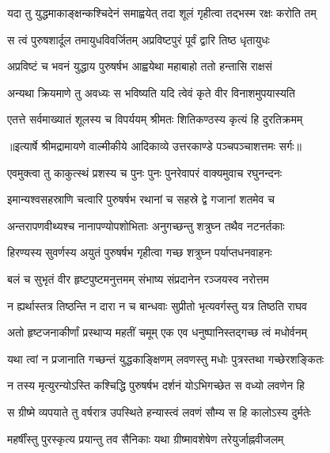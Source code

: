 \twolineshloka
{यदा तु युद्धमाकाङ्क्षन्कश्चिदेनं समाह्वयेत्}
{तदा शूलं गृहीत्वा तद्भस्म रक्षः करोति तम्} %

\twolineshloka
{स त्वं पुरुषशार्दूल तमायुधविवर्जितम्}
{अप्रविष्टपुरं पूर्वं द्वारि तिष्ठ धृतायुधः} %

\twolineshloka
{अप्रविष्टं च भवनं युद्धाय पुरुषर्षभ}
{आह्वयेथा महाबाहो ततो हन्तासि राक्षसं} %

\twolineshloka
{अन्यथा क्रियमाणे तु अवध्यः स भविष्यति}
{यदि त्वेवं कृते वीर विनाशमुपयास्यति} %

\twolineshloka
{एतत्ते सर्वमाख्यातं शूलस्य च विपर्ययम्}
{श्रीमतः शितिकण्ठस्य कृत्यं हि दुरतिक्रमम्} %


{॥इत्यार्षे श्रीमद्रामायणे वाल्मीकीये आदिकाव्ये उत्तरकाण्डे पञ्चपञ्चाशत्तमः सर्गः॥}


\twolineshloka
{एवमुक्त्वा तु काकुत्स्थं प्रशस्य च पुनः पुनः}
{पुनरेवापरं वाक्यमुवाच रघुनन्दनः} %

\twolineshloka
{इमान्यश्वसहस्राणि चत्वारि पुरुषर्षभ}
{रथानां च सहस्रे द्वे गजानां शतमेव च} %

\twolineshloka
{अन्तरापणवीथ्यश्च नानापण्योपशोभिताः}
{अनुगच्छन्तु शत्रुघ्न तथैव नटनर्तकाः} %

\twolineshloka
{हिरण्यस्य सुवर्णस्य अयुतं पुरुषर्षभ}
{गृहीत्वा गच्छ शत्रुघ्न पर्याप्तधनवाहनः} %

\twolineshloka
{बलं च सुभृतं वीर हृष्टपुष्टमनुत्तमम्}
{संभाष्य संप्रदानेन रञ्जयस्व नरोत्तम} %

\twolineshloka
{न ह्यर्थास्तत्र तिष्ठन्ति न दारा न च बान्धवाः}
{सुप्रीतो भृत्यवर्गस्तु यत्र तिष्ठति राघव} %

\twolineshloka
{अतो हृष्टजनाकीर्णां प्रस्थाप्य महतीं चमूम्}
{एक एव धनुष्पानिस्तद्गच्छ त्वं मधोर्वनम्} %

\twolineshloka
{यथा त्वां न प्रजानाति गच्छन्तं युद्धकाङ्क्षिणम्}
{लवणस्तु मधोः पुत्रस्तथा गच्छेरशङ्कितः} %

\twolineshloka
{न तस्य मृत्युरन्योऽस्ति कश्चिद्धि पुरुषर्षभ}
{दर्शनं योऽभिगच्छेत स वध्यो लवणेन हि} %

\twolineshloka
{स ग्रीष्मे व्यपयाते तु वर्षरात्र उपस्थिते}
{हन्यास्त्वं लवणं सौम्य स हि कालोऽस्य दुर्मतेः} %

\twolineshloka
{महर्षींस्तु पुरस्कृत्य प्रयान्तु तव सैनिकाः}
{यथा ग्रीष्मावशेषेण तरेयुर्जाह्नवीजलम्} %

